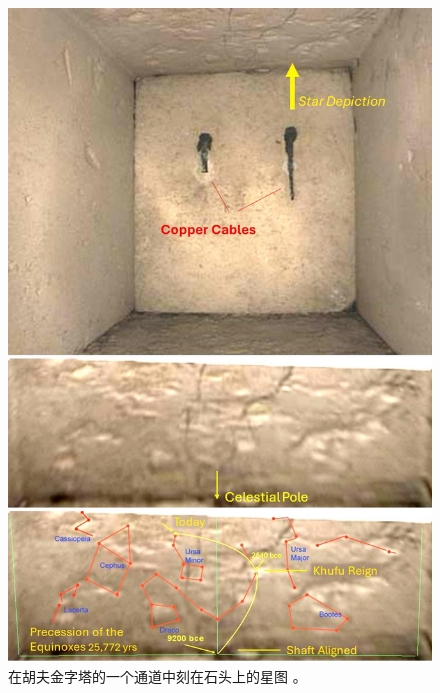 \documentclass[10pt,twocolumn,letterpaper]{article}
\begin{document}
\begin{figure}[H]
\begin{center}
   \includegraphics[width=1\linewidth]{star-stone.jpg}
\end{center}
   \caption{在胡夫金字塔的一个通道中刻在石头上的星图 \cite{28}。}
\label{fig:20}
\label{fig:onecol}
\end{figure}
\end{document}
